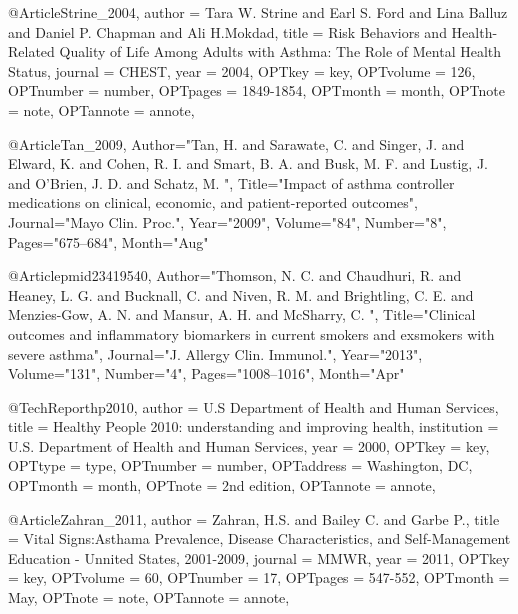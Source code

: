 {{{@Article{Strine_2004,
author = {Tara W. Strine and Earl S. Ford and Lina Balluz and Daniel P. Chapman and Ali H.Mokdad},
title = {Risk Behaviors and Health-Related Quality of Life Among Adults with Asthma: The Role of Mental Health Status},
journal = {CHEST},
year = {2004},
OPTkey = {key},
OPTvolume = {126},
OPTnumber = {number},
OPTpages = {1849-1854},
OPTmonth = {month},
OPTnote = {note},
OPTannote = {annote},
}


@Article{Tan_2009,
   Author="Tan, H.  and Sarawate, C.  and Singer, J.  and Elward, K.  and Cohen, R. I.  and Smart, B. A.  and Busk, M. F.  and Lustig, J.  and O'Brien, J. D.  and Schatz, M. ",
   Title="{{I}mpact of asthma controller medications on clinical, economic, and patient-reported outcomes}",
   Journal="Mayo Clin. Proc.",
   Year="2009",
   Volume="84",
   Number="8",
   Pages="675--684",
   Month="Aug"
}

@Article{pmid23419540,
   Author="Thomson, N. C.  and Chaudhuri, R.  and Heaney, L. G.  and Bucknall, C.  and Niven, R. M.  and Brightling, C. E.  and Menzies-Gow, A. N.  and Mansur, A. H.  and McSharry, C. ",
   Title="{{C}linical outcomes and inflammatory biomarkers in current smokers and exsmokers with severe asthma}",
   Journal="J. Allergy Clin. Immunol.",
   Year="2013",
   Volume="131",
   Number="4",
   Pages="1008--1016",
   Month="Apr"
}

@TechReport{hp2010,
author = {{U.S Department of Health and Human Services}},
title = {Healthy People 2010: understanding and improving health},
institution = {U.S. Department of Health and Human Services},
year = {2000},
OPTkey = {key},
OPTtype = {type},
OPTnumber = {number},
OPTaddress = {Washington, DC},
OPTmonth = {month},
OPTnote = {2nd edition},
OPTannote = {annote},
}







@Article{Zahran_2011,
author = {Zahran, H.S. and Bailey C. and Garbe P.},
title = {Vital Signs:Asthama Prevalence, Disease Characteristics, and Self-Management Education - Unnited States, 2001-2009},
journal = {MMWR},
year = {2011},
OPTkey = {key},
OPTvolume = {60},
OPTnumber = {17},
OPTpages = {547-552},
OPTmonth = {May},
OPTnote = {note},
OPTannote = {annote},
}





}}}
